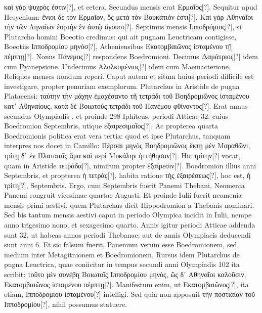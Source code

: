 \textgreek{καὶ γὰρ ψυχρός ἐστιν[?]}, et cetera.
Secundus mensis
erat \textgreek{Ερμαῖος[?]}.
Sequitur apud Hesychium: \textgreek{ἔνιοι δὲ τὸν Ερμαῖον, ὅς
μετὰ τὸν Βουκάτιόν ἐστι[?]}.
\textgreek{Καὶ γὰρ Αθηναῖοι τὴν τῶν Ληναίων ἑορτὴν ἐν ἀυτῷ ἄγουσι[?]}.
Septimus mensis \textgreek{Ιπποδρόμιος[?]},
 si Plutarcho homini Boeotio credimus:
qui ait pugnam Leuctricam contigisse, Boeotiis \textgreek{Ιπποδρομίου
μηνὸσ[?]}, Atheniensibus \textgreek{Εκατομβαιῶνος ἱσταμένου τῇ πέμπτῃ[?]}.
Nonus \textgreek{Πάνεμος[?]}
respondens Boedromioni.
Decimus \textgreek{Δαμάτριος[?]} idem cum
Pyanepsione.
Undecimus \textgreek{Αλαλκομένιος[?]} idem cum Maemacterione.
Reliquos menses nondum reperi.
Caput autem et situm huius periodi
difficile est investigare, propter penuriam exemplorum.
Plutarchus
in Aristide de pugna Plataeensi: \textgreek{ταύτην τὴν μάχην ἐμαχέσαντο
τῆ τετράδι τοῦ Βοηδρομιῶνος ἱσταμένου κατ᾽ Αθηναίους, κατὰ δὲ Βοιωτούς τετράδι
τοῦ Πανέμου φθίνοντος[?]}.
Erat annus secundus Olympiadis , et
proinde 298 Iphiteus, periodi Atticae 32: cuius Boedromion 
Septembris, utique \textgreek{ἐξαιρεσιμαῖος[?]}.
Ac propterea quarta Boedromionis
politica erat vera tertia: quod et ipse Plutarchus, tanquam interpres
nos docet in Camillo: \textgreek{Πέρσαι μηνὸς Βοηδρομιῶνος ἕκτῃ μὲν Μαραθῶνι,
τρίτῃ δ᾽ ἐν Πλαταιαῖς ἅμα καὶ περὶ Μυκάλην ἡττήθησαν[?]}.
Hic \textgreek{τρίτην[?]}
vocat, quam in Aristide \textgreek{τετράδα[?]},
 nimirum propter \textgreek{ἐξαίρεσιν[?]}.
Boedromion illius anni  Septembris,
 et propterea \textgreek{ἡ τετρὰς[?]}, habita
ratione \textgreek{τὴς ὲξαιρἐσεως[?]}, hoc est, \textgreek{ἡ τρίτη[?]},
  Septembris.
Ergo, cum
 Septembris fuerit  Panemi Thebani, Neomenia Panemi
congruit vicesimae quartae Augusti.
Et proinde  Iulii fuerit
neomenia mensis primi aestivi, quem Plutarchus dicit Hippodromion
a Thebanis nominari.
Sed bis tantum mensis aestivi caput in
periodo Olympica incidit in  Iulii, nempe anno trigesimo nono,
et sexagesimo quarto.
Annis igitur periodi Atticae addenda sunt 32,
ut habeas annos periodi Thebanae: aut de annis Olympiacis deducendi
sunt anni 6.
Et sic falsum fuerit, Panemum verum esse Boedromionem,
sed medium inter Metagitnionem et Boedromionem.
Rursus idem Plutarchus de pugna Leuctrica, quae coniicitur in tempus
secundi anni Olympiadis 102 ita scribit: \textgreek{τοῦτο μὲν συνέβη Βοιωτοῖς
Ιπποδρομίου μηνὸς, ῶς δ᾽ Αθηναῖοι καλοῦσιν, Εκατομβαιῶνος ἱσταμένου
πέμπτῃ[?]}.
%
Manifestum enim, ut \textgreek{Εκατομβαιῶνος[?]},
 ita etiam, \textgreek{Ιπποδρομίου
ἱσταμένου[?]} intelligi.
Sed quia non apposuit \textgreek{τὴν ποστιαίαν τοῦ Ιπποδρομίου[?]}, nihil
possumus statuere.
